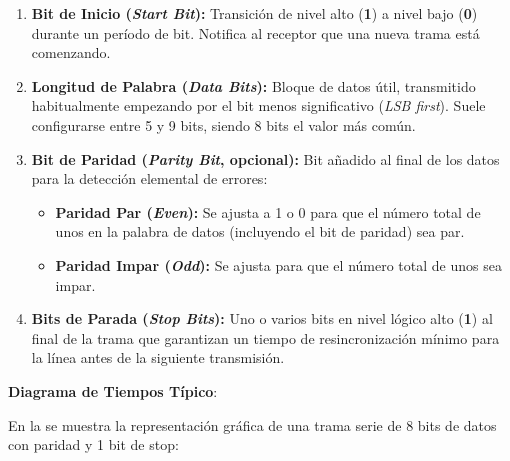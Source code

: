 \documentclass[../main.tex]{subfiles}
\begin{document}
            \begin{enumerate}
                \item \textbf{Bit de Inicio (\textit{Start Bit}):} Transición de nivel alto (\textbf{1}) a nivel bajo (\textbf{0}) durante un período de bit. Notifica al receptor que una nueva trama está comenzando.
                \item \textbf{Longitud de Palabra (\textit{Data Bits}):} Bloque de datos útil, transmitido habitualmente empezando por el bit menos significativo (\textit{LSB first}). Suele configurarse entre 5 y 9 bits, siendo 8 bits el valor más común.
                \item \textbf{Bit de Paridad (\textit{Parity Bit}, opcional):} Bit añadido al final de los datos para la detección elemental de errores:
                \begin{itemize}
                    \item \textbf{Paridad Par (\textit{Even}):} Se ajusta a 1 o 0 para que el número total de unos en la palabra de datos (incluyendo el bit de paridad) sea par.
                    \item \textbf{Paridad Impar (\textit{Odd}):} Se ajusta para que el número total de unos sea impar.
                \end{itemize}
                \item \textbf{Bits de Parada (\textit{Stop Bits}):} Uno o varios bits en nivel lógico alto (\textbf{1}) al final de la trama que garantizan un tiempo de resincronización mínimo para la línea antes de la siguiente transmisión.
            \end{enumerate}

            \textbf{Diagrama de Tiempos Típico}: 

            En la  se muestra la representación gráfica de una trama serie de 8 bits de datos con paridad y 1 bit de stop:
\end{document}
